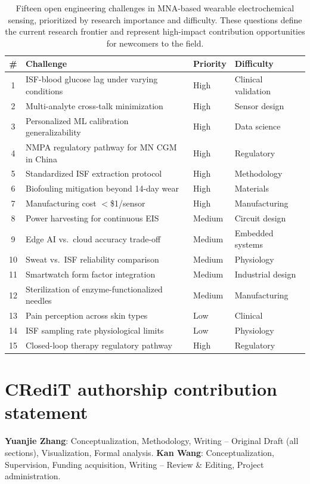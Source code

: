 \documentclass[review,1p]{elsarticle}
\begin{document}
\begin{table}[htbp]
\centering
\small
\caption{Fifteen open engineering challenges in MNA-based wearable electrochemical sensing, prioritized by research importance and difficulty. These questions define the current research frontier and represent high-impact contribution opportunities for newcomers to the field.}
\label{tab:open_questions}
\begin{tabular}{clll}
\toprule
\textbf{\#} & \textbf{Challenge} & \textbf{Priority} & \textbf{Difficulty} \\
\midrule
1 & ISF-blood glucose lag under varying conditions & High & Clinical validation \\
2 & Multi-analyte cross-talk minimization & High & Sensor design \\
3 & Personalized ML calibration generalizability & High & Data science \\
4 & NMPA regulatory pathway for MN CGM in China & High & Regulatory \\
5 & Standardized ISF extraction protocol & High & Methodology \\
6 & Biofouling mitigation beyond 14-day wear & High & Materials \\
7 & Manufacturing cost $<$\$1/sensor & High & Manufacturing \\
8 & Power harvesting for continuous EIS & Medium & Circuit design \\
9 & Edge AI vs.\ cloud accuracy trade-off & Medium & Embedded systems \\
10 & Sweat vs.\ ISF reliability comparison & Medium & Physiology \\
11 & Smartwatch form factor integration & Medium & Industrial design \\
12 & Sterilization of enzyme-functionalized needles & Medium & Manufacturing \\
13 & Pain perception across skin types & Low & Clinical \\
14 & ISF sampling rate physiological limits & Low & Physiology \\
15 & Closed-loop therapy regulatory pathway & High & Regulatory \\
\bottomrule
\end{tabular}
\end{table}


\section*{CRediT authorship contribution statement}
\textbf{Yuanjie Zhang}: Conceptualization, Methodology, Writing -- Original Draft (all sections), Visualization, Formal analysis.
\textbf{Kan Wang}: Conceptualization, Supervision, Funding acquisition, Writing -- Review \& Editing, Project administration.
\end{document}
